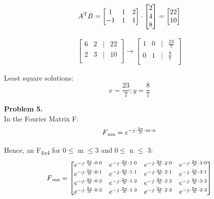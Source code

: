 \documentclass[a4paper]{article}
\begin{document}
\begin{align} 
A\textsuperscript{T}B=
\begin{bmatrix}
   1 & 1 & 2\\
   -1 & 1 & 1 \\
 \end{bmatrix}
 \cdot
 \begin{bmatrix}
   2\\
   4\\
   8\\
 \end{bmatrix} 
 =
\begin{bmatrix}
   22\\
   10\\
 \end{bmatrix}
\end{align}


\begin{align}
\begin{bmatrix}
   6 & 2 & | & 22 \\
   2 & 3 & | & 10\\
 \end{bmatrix}
 \rightarrow
 \begin{bmatrix}
   1 & 0 & | & \frac{23}{7} \\
   0 & 1 & | & \frac{8}{7}\\
 \end{bmatrix}
\end{align}

Least square solutions:
\begin{equation}
x = \frac{23}{7} ; y=\frac{8}{7}
\end{equation}

\hfill \newline
\textbf{Problem 5.}\\
In the Fourier Matrix F:
\begin{equation}
F\textsubscript{mn} = e^{-j \cdot \frac{2 \pi}{N} \cdot m \cdot n}
\end{equation}

Hence, an F\textsubscript{4x4} for 0$\leq$ m $\leq$3 and 0$\leq$ n $\leq$ 3:
\begin{align}
F\textsubscript{mn} =
\begin{bmatrix}
    e^{-j \cdot \frac{2 \pi}{N} \cdot 0 \cdot 0}& e^{-j \cdot \frac{2 \pi}{N} \cdot 1 \cdot 0} & e^{-j \cdot \frac{2 \pi}{N} \cdot 2 \cdot 0} & e^{-j \cdot \frac{2 \pi}{N} \cdot 3 \cdot 0} \\
   e^{-j \cdot \frac{2 \pi}{N} \cdot 0 \cdot 1} & e^{-j \cdot \frac{2 \pi}{N} \cdot 1 \cdot 1} &e^{-j \cdot \frac{2 \pi}{N} \cdot 2 \cdot 1}  &e^{-j \cdot \frac{2 \pi}{N} \cdot 3 \cdot 1}\\
     e^{-j \cdot \frac{2 \pi}{N} \cdot 0 \cdot 2} & e^{-j \cdot \frac{2 \pi}{N} \cdot 1 \cdot 2} &e^{-j \cdot \frac{2 \pi}{N} \cdot 2 \cdot 2}  &e^{-j \cdot \frac{2 \pi}{N} \cdot 3 \cdot 2}\\
  e^{-j \cdot \frac{2 \pi}{N} \cdot 0 \cdot 3} & e^{-j \cdot \frac{2 \pi}{N} \cdot 1 \cdot 3} &e^{-j \cdot \frac{2 \pi}{N} \cdot 2 \cdot 3}  &e^{-j \cdot \frac{2 \pi}{N} \cdot 3 \cdot 3}\\
\end{bmatrix}
\end{align}
\end{document}
